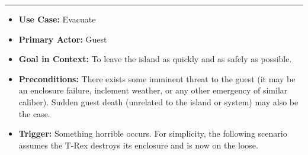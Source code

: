 \documentclass[12pt]{article}
\begin{document}
    \par\noindent\rule{\textwidth}{0.4pt}    
    \begin{itemize}
        \item[]\textbf{Use Case:}                                
            Evacuate

        \item[]\textbf{Primary Actor:}
            Guest

        \item[]\textbf{Goal in Context:}
            To leave the island as quickly and as safely as possible.

        \item[]\textbf{Preconditions:}
            There exists some imminent threat to the guest (it may be an enclosure failure, inclement 
            weather, or any other emergency of similar caliber). Sudden guest death (unrelated to the
            island or system) may also be the case.

        \item[]\textbf{Trigger:}
            Something horrible occurs. For simplicity, the following scenario assumes the T-Rex destroys
            its enclosure and is now on the loose.


\end{itemize}
\end{document}
